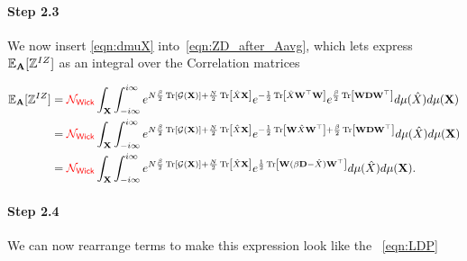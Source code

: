 
\paragraph{Step 2.3}
We now insert \ref{eqn:dmuX} into~\ref{eqn:ZD_after_Aavg},  which lets
express $\mathbb{E}_{\mathbf{A}}[\mathbb{Z}^{IZ}]$ as an integral over the \Teacher Correlation matrices

\begin{align}
  \nonumber
  \mathbb{E}_{\mathbf{A}}[\mathbb{Z}^{IZ}]&=
  {\color{red}\sf{\mathcal{N}_{Wick}}} \int_{\mathbf{X}}  \int_{-i\infty}^{i\infty}
  e^{N\frac{\beta}{2} \mbox{}\operatorname{Tr}\left[\mathcal{G}(\mathbf{X})\right]+\frac{N}{2}\mbox{}\operatorname{Tr}\left[\hat{X}\mathbf{X}\right] }
  e^{-\frac{1}{2}\mbox{}\operatorname{Tr}\left[\hat{X}\mathbf{W}^{\top}\mathbf{W}\right]}
  e^{\frac{\beta}{2}\mbox{}\operatorname{Tr}\left[\mathbf{W}\mathbf{D}\mathbf{W}^{\top}\right]}
  d\mu(\hat{X} )
  d\mu(\mathbf{\mathbf{X}}) \\ 
  \nonumber
  &=
  {\color{red}\sf{\mathcal{N}_{Wick}}} \int_{\mathbf{X}}  \int_{-i\infty}^{i\infty}
  e^{N\frac{\beta}{2}\mbox{}\operatorname{Tr}\left[\mathcal{G}(\mathbf{X})\right]+ \frac{N}{2}\mbox{}\operatorname{Tr}\left[\hat{X}\mathbf{X}\right]}
  e^{-\frac{1}{2}\mbox{}\operatorname{Tr}\left[\mathbf{W}\hat{X}\mathbf{W}^{\top}\right]+
  \frac{\beta}{2}\mbox{}\operatorname{Tr}\left[\mathbf{W}\mathbf{D}\mathbf{W}^{\top}\right]}
  d\mu(\hat{X} )
  d\mu(\mathbf{\mathbf{X}}) \\ 
  \label{eqn:ZD3}
    &=
  {\color{red}\sf{\mathcal{N}_{Wick}}} \int_{\mathbf{X}}  \int_{-i\infty}^{i\infty}
  e^{N\frac{\beta}{2}\mbox{}\operatorname{Tr}\left[\mathcal{G}(\mathbf{X})\right]+
  \frac{N}{2}\mbox{}\operatorname{Tr}\left[\hat{X}\mathbf{X}\right]}
  e^{\frac{1}{2}\mbox{}\operatorname{Tr}\left[\mathbf{W}(\beta\mathbf{D}-\hat{X})\mathbf{W}^{\top}\right]}
  d\mu(\hat{X} )
  d\mu(\mathbf{\mathbf{X}})  .
\end{align}

\paragraph{Step 2.4}
We can now rearrange terms to make this expression look like the \EQN~\ref{eqn:LDP}


